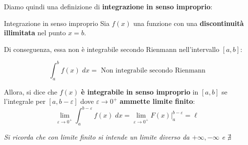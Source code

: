 \documentclass[a4paper, 12pt]{report}
\begin{document}
    Diamo quindi una definizione di \textbf{integrazione in senso improprio}:
    
    \begin{frameddefn}{Integrazione in senso improprio}
        Sia $f(x)$ una funzione con una \textbf{discontinuità illimitata} nel punto $x=b$.
        
        Di conseguenza, essa non è integrabile secondo Rienmann nell'intervallo $[a, b]$:
        
        \[ \int_{a}^{b} f(x) \; dx = \text{ Non integrabile secondo Rienmann}\]
        
        Allora, si dice che $f(x)$ \textbf{è integrabile in senso improprio} in $[a, b]$ se l'integrale per $[a, b-\varepsilon]$ dove $\varepsilon \to 0^+$ \textbf{ammette limite finito}:
        \[ \lim_{\varepsilon \to 0^+} \int_{a}^{b-\varepsilon} f(x) \; dx = \lim_{\varepsilon \to 0^+} F(x) |_{a}^{b-\varepsilon} = \ell\]
        
        \textit{Si ricorda che con limite finito si intende un limite diverso da $+\infty, - \infty $ e $\nexists$}
        
    \end{frameddefn}
    
    \quad
    
\end{document}

